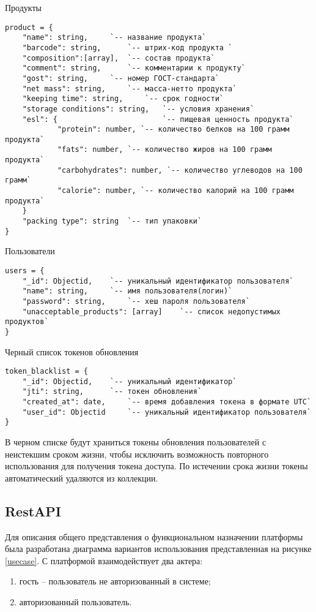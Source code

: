 Продукты
\begin{lstlisting}
product = {
	"name": string,		`-- название продукта`
	"barcode": string,		`-- штрих-код продукта `
	"composition":[array],	`-- состав продукта`
	"comment": string,		`-- комментарии к продукту`
	"gost": string,		`-- номер ГОСТ-стандарта`
	"net mass": string,		`-- масса-нетто продукта`
	"keeping time": string,		`-- срок годности`
	"storage conditions": string,	`-- условия хранения`
	"esl": {  						`-- пищевая ценность продукта`
			"protein": number, `-- количество белков на 100 грамм продукта`
			"fats": number,	`-- количество жиров на 100 грамм продукта`
			"carbohydrates": number, `-- количество углеводов на 100 грамм`
			"calorie": number, `-- количество калорий на 100 грамм продукта`
	}
	"packing type": string  `-- тип упаковки`
}
\end{lstlisting}

Пользователи
\begin{lstlisting}
users = {
	"_id": Objectid,	`-- уникальный идентификатор пользователя` 
	"name": string,		`-- имя пользователя(логин)`			
	"password": string,		`-- хеш пароля пользователя`
	"unacceptable_products": [array]	`-- список недопустимых продуктов`
}
\end{lstlisting}

Черный список токенов обновления
\begin{lstlisting}
token_blacklist = {
	"_id": Objectid,	`-- уникальный идентификатор` 
	"jti": string,		`-- токен обновления`			
	"created_at": date,		`-- время добавления токена в формате UTC`
	"user_id": Objectid		`-- уникальный идентификатор пользователя`
}
\end{lstlisting}

В черном списке будут храниться токены обновления пользователей с неистекшим сроком жизни, чтобы исключить возможность повторного использования для получения токена доступа. По истечении срока жизни токены автоматический удаляются из коллекции.

\subsection{RestAPI}

Для описания общего представления о функциональном назначении
платформы была разработана диаграмма вариантов использования представленная на рисунке \ref{usecase}. С платформой взаимодействует два актера:
\begin{enumerate}
	\item гость -- пользователь не авторизованный в системе;
	\item авторизованный пользователь. 
\end{enumerate}

